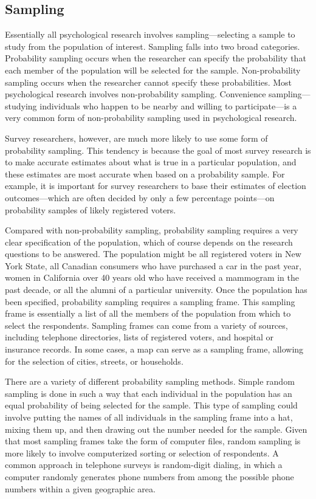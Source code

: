 \subsection{Sampling}

Essentially all psychological research involves sampling---selecting a sample to study from the population of interest. Sampling falls into two broad categories. Probability sampling occurs when the researcher can specify the probability that each member of the population will be selected for the sample. Non-probability sampling occurs when the researcher cannot specify these probabilities. Most psychological research involves non-probability sampling. Convenience sampling---studying individuals who happen to be nearby and willing to participate---is a very common form of non-probability sampling used in psychological research.

Survey researchers, however, are much more likely to use some form of probability sampling. This tendency is because the goal of most survey research is to make accurate estimates about what is true in a particular population, and these estimates are most accurate when based on a probability sample. For example, it is important for survey researchers to base their estimates of election outcomes---which are often decided by only a few percentage points---on probability samples of likely registered voters.

Compared with non-probability sampling, probability sampling requires a very clear specification of the population, which of course depends on the research questions to be answered. The population might be all registered voters in New York State, all Canadian consumers who have purchased a car in the past year, women in California over 40 years old who have received a mammogram in the past decade, or all the alumni of a particular university. Once the population has been specified, probability sampling requires a sampling frame. This sampling frame is essentially a list of all the members of the population from which to select the respondents. Sampling frames can come from a variety of sources, including telephone directories, lists of registered voters, and hospital or insurance records. In some cases, a map can serve as a sampling frame, allowing for the selection of cities, streets, or households.

There are a variety of different probability sampling methods. Simple random sampling is done in such a way that each individual in the population has an equal probability of being selected for the sample. This type of sampling could involve putting the names of all individuals in the sampling frame into a hat, mixing them up, and then drawing out the number needed for the sample. Given that most sampling frames take the form of computer files, random sampling is more likely to involve computerized sorting or selection of respondents. A common approach in telephone surveys is random-digit dialing, in which a computer randomly generates phone numbers from among the possible phone numbers within a given geographic area.

